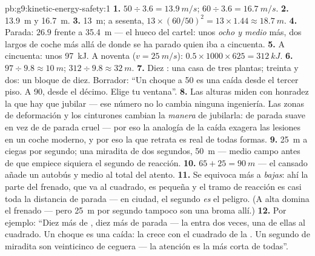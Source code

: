 \begin{solution}{pb:g9:kinetic-energy-safety:1}
\textbf{1.} $50 \div 3.6 = \qty{13.9}{m/s}$; $60 \div 3.6 =
\qty{16.7}{m/s}$.
\textbf{2.} \qty{13.9}{m} y \qty{16.7}{m}.
\textbf{3.} \qty{13}{m}; a sesenta, $13 \times (60/50)^2 = 13 \times
1.44 \approx \qty{18.7}{m}$.
\textbf{4.} Parada: $26.9$ frente a \qty{35.4}{m} --- el hueco del
cartel: unos \emph{ocho  y medio} más, dos largos de coche
más allá de donde se ha parado quien iba a cincuenta.
\textbf{5.} A cincuenta: unos \qty{97}{kJ}. A noventa ($v =
\qty{25}{m/s}$): $0.5 \times 1000 \times 625 = \qty{312}{kJ}$.
\textbf{6.} $97 \div 9.8 \approx \qty{10}{m}$; $312 \div 9.8 \approx
\qty{32}{m}$.
\textbf{7.} Diez : una casa de tres plantas; treinta y dos: un
bloque de diez. Borrador: ``Un choque a 50 es una caída desde el tercer
piso. A 90, desde el décimo. Elige tu ventana''.
\textbf{8.} Las alturas miden con honradez la  que
hay que jubilar --- ese número no lo cambia ninguna ingeniería. Las
zonas de deformación y los cinturones cambian la \emph{manera} de
jubilarla:  de parada suave en vez de  de
parada cruel --- por eso la analogía de la caída exagera las lesiones en
un coche moderno, y por eso la  que retrata es real de
todas formas.
\textbf{9.} \qty{25}{m} a ciegas por segundo; una miradita de dos
segundos, \qty{50}{m} --- medio campo antes de que empiece siquiera el
segundo de reacción.
\textbf{10.} $65 + 25 = \qty{90}{m}$ --- el  cansado añade un
autobús y medio al total del  atento.
\textbf{11.} Se equivoca más a  \emph{bajas}: ahí la
parte del frenado, que va al cuadrado, es pequeña y el tramo de
reacción es casi toda la distancia de parada --- en ciudad, el segundo
\emph{es} el peligro. (A  alta domina el frenado --- pero
\qty{25}{m} por segundo tampoco son una broma allí.)
\textbf{12.} Por ejemplo: ``Diez más de , diez
 más de parada --- la  entra dos veces, una de
ellas al cuadrado. Un choque es una caída: la  crece con
el cuadrado de la . Un segundo de miradita son
veinticinco  de ceguera --- la atención es la
 más corta de todas''.
\end{solution}
